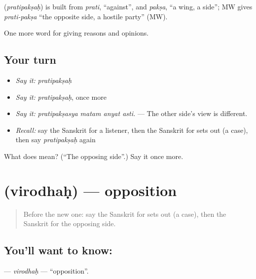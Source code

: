 \begin{cousinweb}
\textbf{} (\emph{pratipakṣaḥ}) is built from \emph{prati}, \textquotedblleft{}against\textquotedblright{}, and \emph{pakṣa}, \textquotedblleft{}a wing, a side\textquotedblright{}; MW gives \emph{prati-pakṣa} \textquotedblleft{}the opposite side, a hostile party\textquotedblright{} (MW).
\end{cousinweb}

\begin{grammarlens}[title={What you've built}]
One more word for giving reasons and opinions.
\end{grammarlens}

\subsection*{Your turn}
\begin{itemize}
\raggedright
  \item \emph{Say it:} \emph{pratipakṣaḥ}
  \item \emph{Say it:} \emph{pratipakṣaḥ}, once more
  \item \emph{Say it:} \emph{pratipakṣasya matam anyat asti.} — The other side's view is different.
  \item \emph{Recall:} say the Sanskrit for a listener, then the Sanskrit for sets out (a case), then say \emph{pratipakṣaḥ} again
\end{itemize}

\begin{tcolorbox}[breakable,colback=teal!4,colframe=teal!35!black,title={Before you move on}]
What does  mean? (\textquotedblleft{}The opposing side\textquotedblright{}.) Say it once more.
\end{tcolorbox}
\section[\texorpdfstring{\sk{विरोधः} (virodhaḥ)}{विरोधः (virodhaḥ)}]{ (virodhaḥ) — opposition}

\label{lesson:SA-C344-virodhah}



\begin{quote}
Before the new one: say the Sanskrit for sets out (a case), then the Sanskrit for the opposing side.
\end{quote}

\subsection*{You'll want to know: }
\textbf{} — \emph{virodhaḥ} — \textquotedblleft{}opposition\textquotedblright{}.

